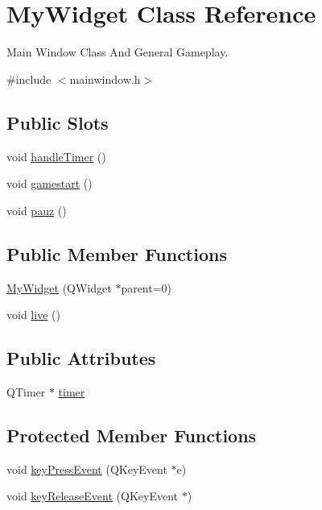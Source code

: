 \hypertarget{classMyWidget}{\section{\-My\-Widget \-Class \-Reference}
\label{classMyWidget}
}


\-Main \-Window \-Class \-And \-General \-Gameplay.  




{\ttfamily \#include $<$mainwindow.\-h$>$}

\subsection*{\-Public \-Slots}
\begin{DoxyCompactItemize}
\item 
void \hyperlink{classMyWidget_a7fe115a58a90c7ab2fcd9a53f22a5480}{handle\-Timer} ()
\item 
void \hyperlink{classMyWidget_ac865162c8fd0a248ff3c898acf44346a}{gamestart} ()
\item 
void \hyperlink{classMyWidget_af010626705546e924ce283a7b1a29f44}{pauz} ()
\end{DoxyCompactItemize}
\subsection*{\-Public \-Member \-Functions}
\begin{DoxyCompactItemize}
\item 
\hyperlink{classMyWidget_a228e0cdad7acf281b07d50f131ce126b}{\-My\-Widget} (\-Q\-Widget $\ast$parent=0)
\item 
void \hyperlink{classMyWidget_a4524740a902212a980aa6418a5ead60a}{live} ()
\end{DoxyCompactItemize}
\subsection*{\-Public \-Attributes}
\begin{DoxyCompactItemize}
\item 
\-Q\-Timer $\ast$ \hyperlink{classMyWidget_a923b117544cec8aff3fb8cc50fe6853a}{timer}
\end{DoxyCompactItemize}
\subsection*{\-Protected \-Member \-Functions}
\begin{DoxyCompactItemize}
\item 
void \hyperlink{classMyWidget_ace80c33361b5ab60cf68bdb7b402e8cc}{key\-Press\-Event} (\-Q\-Key\-Event $\ast$e)
\item 
void \hyperlink{classMyWidget_a1c141bc73b239b6d2114cff966da0eb4}{key\-Release\-Event} (\-Q\-Key\-Event $\ast$)
\end{DoxyCompactItemize}


